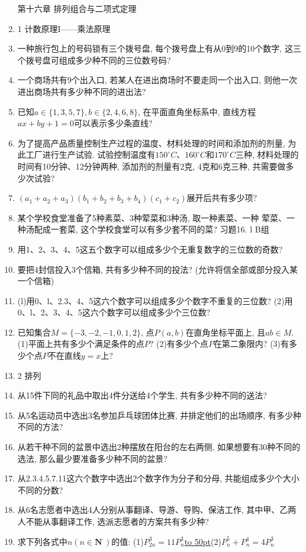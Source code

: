 \documentclass[10pt,a4paper]{article}
\newcommand{\blank}[1]{\underline{\hbox to #1pt{}}}
\begin{document}
\begin{enumerate}[1.]
第十六章  排列组合与二项式定理
\item 1  计数原理I——乘法原理
\item 一种旅行包上的号码锁有三个拨号盘, 每个拨号盘上有从0到9的10个数字, 这三个拨号盘可组成多少种不同的三位数号码?
\item 一个商场共有9个出入口, 若某人在进出商场时不要走同一个出入口, 则他一次进出商场共有多少种不同的进出法?
\item 已知$a\in \{1,3,5,7\},b\in \{2,4,6,8\}$, 在平面直角坐标系中, 直线方程$ax+by+1=0$可以表示多少条直线?
\item 为了提高产品质量控制生产过程的温度、材料处理的时间和添加剂的剂量, 为此工厂进行生产试验. 试验控制温度有$150^\circ C$、$160^\circ C$和$170^\circ C$三种, 材料处理的时间有10分钟、12分钟两种, 添加剂的剂量有2克, 4克和6克三种, 共需要做多少次试验?
\item $(a_1+a_2+a_3)(b_1+b_2+b_3+b_4)(c_1+c_2)$展开后共有多少项?
\item 某个学校食堂准备了5种素菜、3种荤菜和3种汤, 取一种素菜、一种
荤菜、一种汤配成一套菜, 这个学校食堂可以有多少套不同的菜?
习题16. l B组
\item 用1、2、3、4、5这五个数字可以组成多少个无重复数字的三位数的奇数?
\item 要把4封信投入3个信箱, 共有多少种不同的投法? (允许将信全部或部分投入某一个信箱)
\item (l)用0、l、2.3、4、5这六个数字可以组成多少个数字不重复的三位数?
(2)用0、l、2、3、4、5这六个数字可以组成多少个三位数?
\item 已知集合$M=\{-3,-2,-1,0,1,2\}$, 点$P(a,b)$在直角坐标平面上, 且$ab\in M$.
(1)平面上共有多少个满足条件的点$P$?
(2)有多少个点$P$在第二象限内?
(3)有多少个点$P$不在直线$y=x$上?
\item 2   排列
\item 从15件下同的礼品中取出4件分送给4个学生, 共有多少种不同的送法?
\item 从5名运动员中选出3名参加乒乓球团体比赛, 并排定他们的出场顺序, 有多少种不同的方法?
\item 从若干种不同的盆景中选出2种摆放在阳台的左右两侧, 如果想要有30种不同的选法, 那么最少要准备多少种不同的盆景?
\item 从2.3.4.5.7.11这六个数字中选出2个数字作为分子和分母, 共能组成多少个大小不同的分数?
\item 从6名志愿者中选出4人分别从事翻译、导游、导购、保洁工作, 其中甲、乙两人不能从事翻译工作, 选派志愿者的方案共有多少种?
\item 求下列各式中$n(n\in \mathbf{N}^{\cdot })$的值:
(1)$P_{2n}^3=11P_n^3$\blank{50}(2)$P_n^5+P_n^4=4P_n^3$

\end{enumerate}
\end{document}
